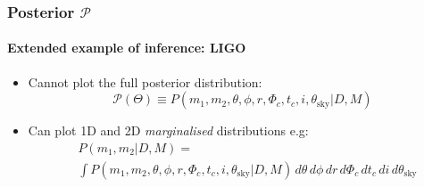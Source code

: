 \documentclass[%
]{beamer}
\begin{document}
\begin{frame}
\end{frame}



\begin{frame}
    \frametitle{Posterior $\mathcal{P}$}
    \framesubtitle{Extended example of inference: LIGO}
    \begin{itemize}
        \item Cannot plot the full posterior distribution:
            \[\mathcal{P}(\Theta) \equiv P(m_1,m_2,\theta,\phi,r,\Phi_c, t_c, i, \theta_\text{sky}|D,M)\]
        \item Can plot 1D and 2D {\em marginalised\/} distributions e.g:
            \begin{align}
            &P(m_1,m_2|D,M)=\nonumber\\&\int P(m_1,m_2,\theta,\phi,r,\Phi_c, t_c, i, \theta_\text{sky}|D,M) \,d\theta \,d\phi \,dr \,d\Phi_c \,d t_c \,d i \,d\theta_\text{sky}\nonumber
            \end{align}
    \end{itemize}
\end{frame}
\end{document}
